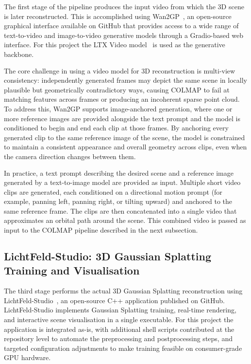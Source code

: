 \documentclass[conference]{IEEEtran}
\begin{document}
The first stage of the pipeline produces the input video from which the 3D scene is later reconstructed. This is accomplished using Wan2GP~\cite{wan2gp_site}, an open-source graphical interface available on GitHub that provides access to a wide range of text-to-video and image-to-video generative models through a Gradio-based web interface. For this project the LTX Video model~\cite{ltxvideo_paper} is used as the generative backbone.

The core challenge in using a video model for 3D reconstruction is multi-view consistency: independently generated frames may depict the same scene in locally plausible but geometrically contradictory ways, causing COLMAP to fail at matching features across frames or producing an incoherent sparse point cloud. To address this, Wan2GP supports image-anchored generation, where one or more reference images are provided alongside the text prompt and the model is conditioned to begin and end each clip at those frames. By anchoring every generated clip to the same reference image of the scene, the model is constrained to maintain a consistent appearance and overall geometry across clips, even when the camera direction changes between them.

In practice, a text prompt describing the desired scene and a reference image generated by a text-to-image model are provided as input. Multiple short video clips are generated, each conditioned on a directional motion prompt (for example, panning left, panning right, or tilting upward) and anchored to the same reference frame. The clips are then concatenated into a single video that approximates an orbital path around the scene. This combined video is passed as input to the COLMAP pipeline described in the next subsection.

\subsection{LichtFeld-Studio: 3D Gaussian Splatting Training and Visualisation}

The third stage performs the actual 3D Gaussian Splatting reconstruction using LichtFeld-Studio~\cite{lichtfeld_studio_site}, an open-source C++ application published on GitHub. LichtFeld-Studio implements Gaussian Splatting training, real-time rendering, and interactive scene visualisation in a single executable. For this project the application is integrated as-is, with additional shell scripts contributed at the repository level to automate the preprocessing and postprocessing steps, and targeted configuration adjustments to make training feasible on consumer-grade GPU hardware.
\end{document}
